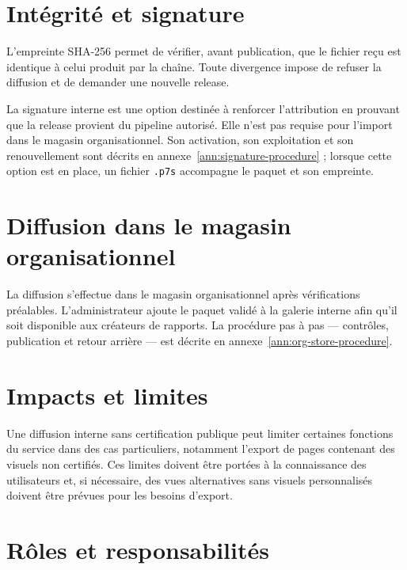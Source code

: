 \section{Intégrité et signature}
\label{sec:signature-principes}

L’empreinte SHA-256 permet de vérifier, avant publication, que le fichier reçu est identique à celui produit par la chaîne. Toute divergence impose de refuser la diffusion et de demander une nouvelle release.

La signature interne est une option destinée à renforcer l’attribution en prouvant que la release provient du pipeline autorisé. Elle n’est pas requise pour l’import dans le magasin organisationnel. Son activation, son exploitation et son renouvellement sont décrits en annexe~\ref{ann:signature-procedure} ; lorsque cette option est en place, un fichier \texttt{.p7s} accompagne le paquet et son empreinte.

\section{Diffusion dans le magasin organisationnel}
\label{sec:distribution}

La diffusion s’effectue dans le magasin organisationnel après vérifications préalables. L’administrateur ajoute le paquet validé à la galerie interne afin qu’il soit disponible aux créateurs de rapports. La procédure pas à pas — contrôles, publication et retour arrière — est décrite en annexe~\ref{ann:org-store-procedure}.

\section{Impacts et limites}
\label{sec:limitations}

Une diffusion interne sans certification publique peut limiter certaines fonctions du service dans des cas particuliers, notamment l’export de pages contenant des visuels non certifiés. Ces limites doivent être portées à la connaissance des utilisateurs et, si nécessaire, des vues alternatives sans visuels personnalisés doivent être prévues pour les besoins d’export.

\section{Rôles et responsabilités}
\label{sec:roles-controle}

